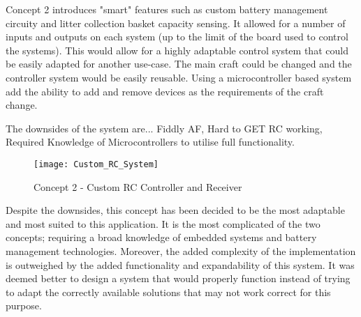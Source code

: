 \documentclass [11pt]{article}
\begin{document}
Concept 2 introduces "smart" features such as custom battery management circuity and litter collection basket capacity sensing. It allowed for a number of inputs and outputs on each system (up to the limit of the board used to control the systems). This would allow for a highly adaptable control system that could be easily adapted for another use-case. The main craft could be changed and the controller system would be easily reusable. Using a microcontroller based system add the ability to add and remove devices as the requirements of the craft change.

The downsides of the system are... Fiddly AF, Hard to GET RC working, Required Knowledge of Microcontrollers to utilise full functionality.  

\begin{figure}[H]
\centerline{\texttt{[image: Custom\_RC\_System]}}
\caption{Concept 2 - Custom RC Controller and Receiver}
\label{fig:Custom_RC_System}
\end{figure} 

Despite the downsides, this concept has been decided to be the most adaptable and most suited to this application. It is the most complicated of the two concepts; requiring a broad knowledge of embedded systems and battery management technologies. Moreover, the added complexity of the implementation is outweighed by the added functionality and expandability of this system. It was deemed better to design a system that would properly function instead of trying to adapt the correctly available solutions that may not work correct for this purpose. 



\end{document}
